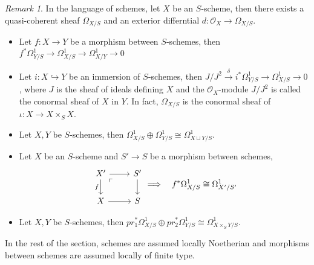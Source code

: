 \documentclass[leqno]{amsart}
\newcommand{\oo}{\mathcal O}
\newcommand{\1}{\mathbf{1}}
\theoremstyle{definition}
\theoremstyle{remark}
\newtheorem{rem}[thm]{Remark}
\begin{document}
\begin{rem}
	In the language of schemes,
	let $X$ be an $S$-scheme,
	then there exists a quasi-coherent sheaf
	$\Omega_{X/S}$ and an exterior differntial
	$d\colon \oo_X\to \Omega_{X/S}$.
\begin{itemize}
	\item Let $f\colon X\to Y$
	be a morphism between $S$-schemes, then
	$f^*\Omega^1_{Y/S}\to\Omega^1_{X/S}\to\Omega^1_{X/Y}\to0$
	\item Let $i\colon X\hookrightarrow Y$ be an immersion
	of  $S$-schemes, then
	$J/J^2\xrightarrow{\delta}i^*\Omega^1_{Y/S}
	\to\Omega^1_{X/S}\to 0$,
	where $J$ is the sheaf of ideals
	defining  $X$ and
	the $\oo_X$-module $J/J^2$ is called
	the conormal sheaf of $X$ in  $Y$.
	In fact, $\Omega_{X/S}$ is the conormal sheaf of
	$\iota\colon X\to X\times_SX$.
	\item Let $X, Y$ be  $S$-schemes, then
	$\Omega^1_{X/S}\oplus \Omega^1_{Y/S}
	\cong \Omega^1_{X\sqcup Y/S}$.
	\item Let $X$ be an $S$-scheme and
	$S'\to S$ be a morphism between schemes,
	\[
		\begin{tikzcd}
			X'
		\arrow[dr, phantom, "\ulcorner", very near start]
		\arrow[d,"f",swap]\arrow[r]& S'\arrow[d]\\
		X\arrow[r]& S
		\end{tikzcd}\Longrightarrow\quad
		f^*\Omega^1_{X/S}\cong \Omega^1_{X'/S'}
	\]
	\item Let $X, Y$ be  $S$-schemes, then
	 $pr_1^*\Omega^1_{X/S}\oplus pr_2^*\Omega^1_{Y/S}
	 \cong \Omega^1_{X\times_SY/S}$.
\end{itemize}
\end{rem}

In the rest of the section,
schemes are assumed locally Noetherian
and morphisms between schemes are assumed
locally of finite type.
\end{document}
